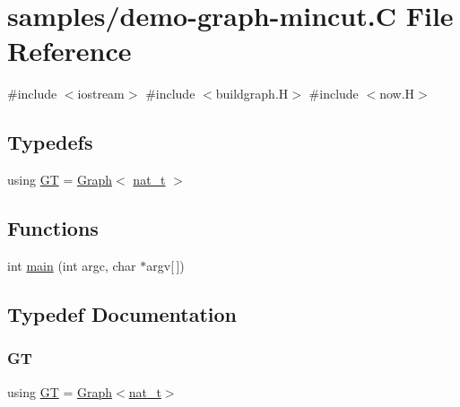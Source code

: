 \hypertarget{demo-graph-mincut_8_c}{}\section{samples/demo-\/graph-\/mincut.C File Reference}
\label{demo-graph-mincut_8_c}
{\ttfamily \#include $<$iostream$>$}\newline
{\ttfamily \#include $<$buildgraph.\+H$>$}\newline
{\ttfamily \#include $<$now.\+H$>$}\newline
\subsection*{Typedefs}
\begin{DoxyCompactItemize}
\item 
using \hyperlink{demo-graph-mincut_8_c_a3001c40d2c31ca87ed96cd7d1334a55e}{GT} = \hyperlink{class_designar_1_1_graph}{Graph}$<$ \hyperlink{namespace_designar_aa72662848b9f4815e7bf31a7cf3e33d1}{nat\+\_\+t} $>$
\end{DoxyCompactItemize}
\subsection*{Functions}
\begin{DoxyCompactItemize}
\item 
int \hyperlink{demo-graph-mincut_8_c_a0ddf1224851353fc92bfbff6f499fa97}{main} (int argc, char $\ast$argv\mbox{[}$\,$\mbox{]})
\end{DoxyCompactItemize}


\subsection{Typedef Documentation}
\mbox{\label{demo-graph-mincut_8_c_a3001c40d2c31ca87ed96cd7d1334a55e}} 
\subsubsection{\texorpdfstring{GT}{GT}}
{\footnotesize\ttfamily using \hyperlink{demo-buildgraph_8_c_a3001c40d2c31ca87ed96cd7d1334a55e}{GT} =  \hyperlink{class_designar_1_1_graph}{Graph}$<$\hyperlink{namespace_designar_aa72662848b9f4815e7bf31a7cf3e33d1}{nat\+\_\+t}$>$}



